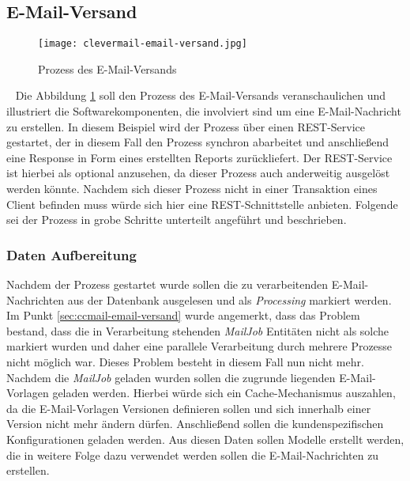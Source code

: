 \newpage
\subsection{E-Mail-Versand}
\begin{figure}[h]
\centering
\texttt{[image: clevermail-email-versand.jpg]} %
\caption{Prozess des E-Mail-Versands}
\label{fig:clevermail-email-versand}
\end{figure}
\ \newpage
Die Abbildung \ref{fig:clevermail-email-versand} soll den Prozess des E-Mail-Versands veranschaulichen und illustriert die Softwarekomponenten, die involviert sind um eine E-Mail-Nachricht zu erstellen. In diesem Beispiel wird der Prozess über einen REST-Service gestartet, der in diesem Fall den Prozess synchron abarbeitet und anschließend eine Response in Form eines erstellten Reports zurückliefert. Der REST-Service ist hierbei als optional anzusehen, da dieser Prozess auch anderweitig ausgelöst werden könnte. Nachdem sich dieser Prozess nicht in einer Transaktion eines Client befinden muss würde sich hier eine REST-Schnittstelle anbieten.
\newline
\newline
Folgende sei der Prozess in grobe Schritte unterteilt angeführt und beschrieben.

\subsubsection{Daten Aufbereitung}
Nachdem der Prozess gestartet wurde sollen die zu verarbeitenden E-Mail-Nachrichten aus der Datenbank ausgelesen und als \emph{Processing} markiert werden. Im Punkt \ref{sec:ccmail-email-versand} wurde angemerkt, dass das Problem bestand, dass die in Verarbeitung stehenden \emph{MailJob} Entitäten nicht als solche markiert wurden und daher eine parallele Verarbeitung durch mehrere Prozesse nicht möglich war. Dieses Problem besteht in diesem Fall nun nicht mehr. Nachdem die \emph{MailJob} geladen wurden sollen die zugrunde liegenden E-Mail-Vorlagen geladen werden. Hierbei würde sich ein Cache-Mechanismus auszahlen, da die E-Mail-Vorlagen Versionen definieren sollen und sich innerhalb einer Version nicht mehr ändern dürfen. Anschließend sollen die kundenspezifischen Konfigurationen geladen werden. Aus diesen Daten sollen Modelle erstellt werden, die in weitere Folge dazu verwendet werden sollen die E-Mail-Nachrichten zu erstellen.

